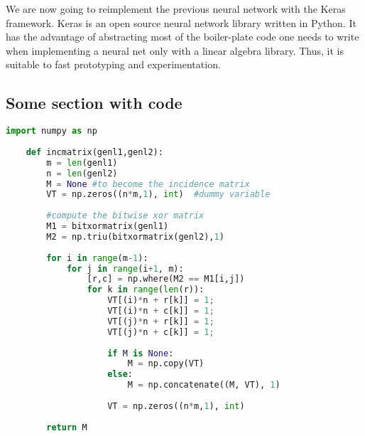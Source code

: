 
We are now going to reimplement the previous neural network with the Keras framework. Keras is an open source neural network library written in Python. It has the advantage of abstracting most of the boiler-plate code one needs to write when implementing a neural net only with a linear algebra library. Thus, it is suitable to fast prototyping and experimentation.

\subsection{Some section with code}

\begin{lstlisting}[language=Python]
    import numpy as np
     
    def incmatrix(genl1,genl2):
        m = len(genl1)
        n = len(genl2)
        M = None #to become the incidence matrix
        VT = np.zeros((n*m,1), int)  #dummy variable
     
        #compute the bitwise xor matrix
        M1 = bitxormatrix(genl1)
        M2 = np.triu(bitxormatrix(genl2),1) 
     
        for i in range(m-1):
            for j in range(i+1, m):
                [r,c] = np.where(M2 == M1[i,j])
                for k in range(len(r)):
                    VT[(i)*n + r[k]] = 1;
                    VT[(i)*n + c[k]] = 1;
                    VT[(j)*n + r[k]] = 1;
                    VT[(j)*n + c[k]] = 1;
     
                    if M is None:
                        M = np.copy(VT)
                    else:
                        M = np.concatenate((M, VT), 1)
     
                    VT = np.zeros((n*m,1), int)
     
        return M
\end{lstlisting}